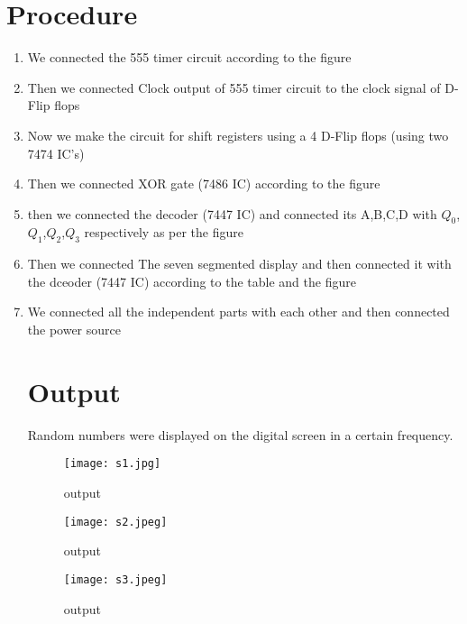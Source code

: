 \documentclass[journal,12pt,twocolumn]{IEEEtran}
\begin{document}
\section*{\textbf{Procedure}}
\begin{enumerate}
	\item We connected the 555 timer circuit according to the figure 
	
	
	\item Then we connected Clock output of 555 timer circuit to the clock signal of D-Flip flops
	
	\item Now we make the circuit for shift registers using a 4 D-Flip flops (using two 7474 IC's)
	

	\item Then we connected XOR gate (7486 IC) according to the figure  
	

	\item then we connected the decoder (7447 IC) and connected its A,B,C,D with $Q_0$,$Q_1$,$Q_2$,$Q_3$ respectively as per the figure 
	
		
	\item Then we connected The seven segmented display and then connected it with the dceoder (7447 IC) according to the table and the figure 

	\item We connected all the independent parts with each other and then connected the power source
	
	
\section*{Output} 
	Random numbers were displayed on the digital screen in a certain frequency.
	\begin{figure}[h]
		\texttt{[image: s1.jpg]}
		\caption{output}
		\label{output}
	\end{figure}
	\begin{figure}[h]
		\texttt{[image: s2.jpeg]}
		\caption{output}
		\label{output}
	\end{figure}
	\begin{figure}[h]
		\texttt{[image: s3.jpeg]}
		\caption{output}
		\label{output}
	\end{figure}
	
\end{enumerate}
\end{document}
